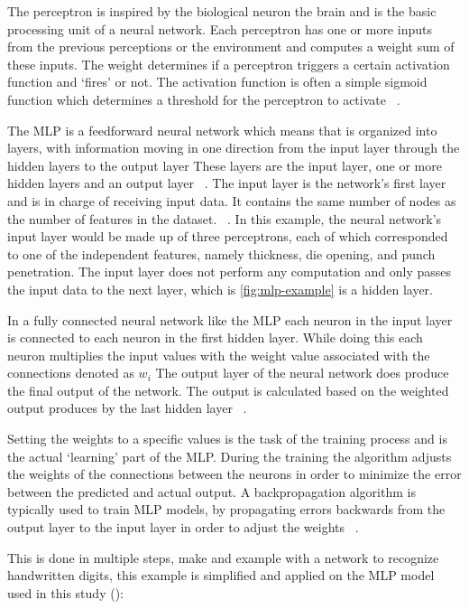 The perceptron is inspired by the biological neuron the brain and is the basic processing unit of a neural
network.
Each perceptron has one or more inputs from the previous perceptions or the environment and computes a weight sum of
these inputs.
The weight determines if a perceptron triggers a certain activation function and `fires' or
not.
The activation function is often a simple sigmoid function which determines a threshold for the perceptron to activate
~\cite[pp. 271--273]{alpaydin2020introduction}.

The MLP is a feedforward neural network which means that is organized into layers, with information
moving in one direction from the input layer through the hidden layers to the output
layer
These layers are the input layer, one or more hidden layers and an output
layer
~\cite[pp. 279--280]{bishop1995neural}.
The input layer is the network's first layer and is in charge of receiving input data. It contains the same number of
nodes as the number of features in the dataset.
~\cite[p. 105]{muller_introductionmachinelearning_2016}.
In this example, the neural network's input layer would be made up of three perceptrons, each of which corresponded
to one of the independent features, namely thickness, die opening, and punch penetration.
The input layer does not perform any computation and only passes the input data to the next layer, which is
\cref{fig:mlp-example} is a hidden layer.

In a fully connected neural network like the MLP each neuron in the input layer is connected to each neuron in the
first hidden layer.
While doing this each neuron multiplies the input values with the weight value associated with the connections
denoted as $w_i$
The output layer of the neural network does produce the final output of the network.
The output is calculated based on the weighted output produces by the last hidden layer
~\cite[p. 106]{muller_introductionmachinelearning_2016}.

Setting the weights to a specific values is the task of the training process and is the actual `learning' part of the
MLP.
During the training the algorithm adjusts the weights of the connections between the neurons in order to minimize
the error between the predicted and actual output.
A backpropagation algorithm is typically used to train \ac{MLP} models, by
propagating errors backwards from the output layer to the input layer in order to adjust
the weights
~\cite[p. 454]{taud2018multilayer}.

This is done in multiple steps, \cite{nielsen_neuralnetworksdeep_2015} make and example with a network to recognize
handwritten digits, this example is simplified and applied on the MLP model used in this study
(\cite[p. 12--24]{nielsen_neuralnetworksdeep_2015}):

